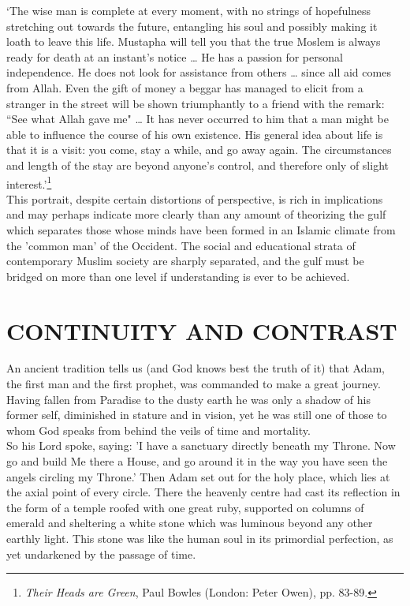 \documentclass[10pt, twoside,openright]{book}
\begin{document}
`The wise man is complete at every moment, with no strings of hopefulness stretching out towards the future, entangling his soul and possibly making it loath to leave this life. Mustapha will tell you that the true Moslem is always ready for death at an instant's notice \ldots{} He has a passion for personal independence. He does not look for assistance from others \ldots{} since all aid comes from Allah. Even the gift of money a beggar has managed to elicit from a stranger in the street will be shown triumphantly to a friend with the remark: ``See what Allah gave me" \ldots{} It has never occurred to him that a man might be able to influence the course of his own existence. His general idea about life is that it is a visit: you come, stay a while, and go away again. The circumstances and length of the stay are beyond anyone's control, and therefore only of slight interest.'\footnote{\emph{Their Heads are Green}, Paul Bowles (London: Peter Owen), pp. 83-89.}\\

This portrait, despite certain distortions of perspective, is rich in implications and may perhaps indicate more clearly than any amount of theorizing the gulf which separates those whose minds have been formed in an Islamic climate from the 'common man' of the Occident. The social and educational strata of contemporary Muslim society are sharply separated, and the gulf must be bridged on more than one level if understanding is ever to be achieved. \\

\chapter{CONTINUITY AND CONTRAST}

An ancient tradition tells us (and God knows best the truth of it) that Adam, the first man and the 
first prophet, was commanded to make a great journey. Having fallen from Paradise to the dusty earth 
he was only a shadow of his former self, diminished in stature and in vision, yet he was still one of 
those to whom God speaks from behind the veils of time and mortality. \\

So his Lord spoke, saying: 'I have a sanctuary directly beneath my Throne. Now go and build Me there 
a House, and go around it in the way you have seen the angels circling my Throne.' Then Adam set out 
for the holy place, which lies at the axial point of every circle. There the heavenly centre had cast 
its reflection in the form of a temple roofed with one great ruby, supported on columns of emerald 
and sheltering a white stone which was luminous beyond any other earthly light. This stone was like 
the human soul in its primordial perfection, as yet undarkened by the passage of time. \\
\end{document}
